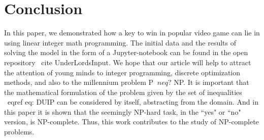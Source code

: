 \documentclass{article}
\begin{document}
\section{Conclusion}
\label{SectionConclusion}
In this paper, we demonstrated how a key to win in popular video game can lie in using linear integer math programming.
The initial data and the results of solving the model in the form of a Jupyter-notebook can be found in the open repository \ cite {UnderLordsInput}.
We hope that our article will help to attract the attention of young minds to integer programming, discrete optimization methods, and also to the millennium problem P $ \ neq? $ NP.
It is important that the mathematical formulation of the problem given by the set of inequalities \ eqref {eq: DUIP} can be considered by itself, abstracting from the domain. And in this paper it is shown that the seemingly NP-hard task, in the ``yes" or ``no" version, is NP-complete.
Thus, this work contributes to the study of NP-complete problems.



\end{document}
